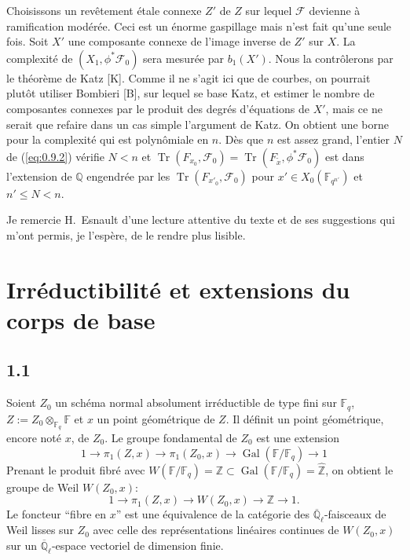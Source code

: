 \documentclass[11pt,a4paper]{article}
\theoremstyle{plain}
\theoremstyle{definition}
\DeclareMathOperator{\Gal}{Gal}
\DeclareMathOperator{\tr}{Tr}
\begin{document}
Choisissons un rev\^etement \'etale connexe $Z'$ de $Z$ sur lequel $\mathcal{F}$ devienne \`a ramification mod\'er\'ee. Ceci est un \'enorme gaspillage mais n'est fait qu'une seule fois. Soit $X'$ une composante connexe de l'image inverse de $Z'$ sur $X$. La complexit\'e de $(X_1, \phi^* \mathcal{F}_0)$ sera mesur\'ee par $b_1(X')$. Nous la contr\^olerons par le th\'eor\`eme de Katz [K]. Comme il ne s'agit ici que de courbes, on pourrait plut\^ot utiliser Bombieri [B], sur lequel se base Katz, et estimer le nombre de composantes connexes par le produit des degr\'es d'\'equations de $X'$, mais ce ne serait que refaire dans un cas simple l'argument de Katz. On obtient une borne pour la complexit\'e qui est polyn\^omiale en $n$. D\`es que $n$ est assez grand, l'entier $N$ de (\ref{eq:0.9.2}) v\'erifie $N < n$ et $\tr(F_{x_0}, \mathcal{F}_0) = \tr(F_{\tilde{x}}, \phi^* \mathcal{F}_0)$ est dans l'extension de $\mathbb{Q}$ engendr\'ee par les $\tr(F_{x'_0}, \mathcal{F}_0)$ pour $x' \in X_0(\mathbb{F}_{q^{n'}})$ et $n' \leq N < n$.

Je remercie H.~Esnault d'une lecture attentive du texte et de ses suggestions qui m'ont permis, je l'esp\`ere, de le rendre plus lisible.

\section{Irr\'eductibilit\'e et extensions du corps de base}

\subsection{1.1}

Soient $Z_0$ un sch\'ema normal absolument irr\'eductible de type fini sur $\mathbb{F}_q$, $Z := Z_0 \otimes_{\mathbb{F}_q} \mathbb{F}$ et $x$ un point g\'eom\'etrique de $Z$. Il d\'efinit un point g\'eom\'etrique, encore not\'e $x$, de $Z_0$. Le groupe fondamental de $Z_0$ est une extension
\[
1 \to \pi_1(Z,x) \to \pi_1(Z_0,x) \to \Gal(\mathbb{F}/\mathbb{F}_q) \to 1
\]
Prenant le produit fibr\'e avec $W(\mathbb{F}/\mathbb{F}_q) = \mathbb{Z} \subset \Gal(\mathbb{F}/\mathbb{F}_q) = \hat{\mathbb{Z}}$, on obtient le groupe de Weil $W(Z_0,x)$:
\[
1 \to \pi_1(Z,x) \to W(Z_0,x) \to \mathbb{Z} \to 1.
\]
Le foncteur ``fibre en $x$'' est une \'equivalence de la cat\'egorie des $\overline{\mathbb{Q}}_\ell$-faisceaux de Weil lisses sur $Z_0$ avec celle des repr\'esentations lin\'eaires continues de $W(Z_0,x)$ sur un $\overline{\mathbb{Q}}_\ell$-espace vectoriel de dimension finie.
\end{document}
